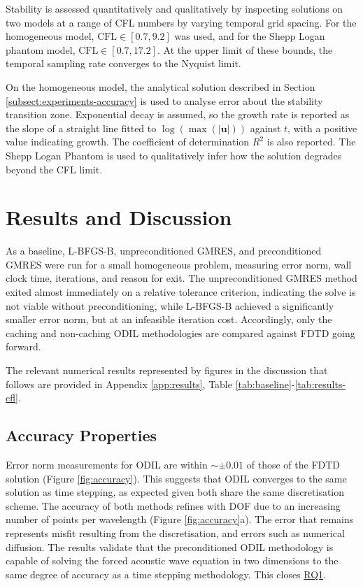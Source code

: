 \documentclass[final-report]{report-template}
\begin{document}
Stability is assessed quantitatively and qualitatively by inspecting solutions on two models at a range of CFL numbers by varying temporal grid spacing. For the homogeneous model, $\text{CFL} \in[0.7, 9.2]$ was used, and for the Shepp Logan phantom model, $\text{CFL}\in[0.7, 17.2]$. At the upper limit of these bounds, the temporal sampling rate converges to the Nyquist limit. 

On the homogeneous model, the analytical solution described in Section \ref{subsect:experiments-accuracy} is used to analyse error about the stability transition zone. Exponential decay is assumed, so the growth rate is reported as the slope of a straight line fitted to $\log\left(\max(|\mathbf{u}|)\right)$ against $t$, with a positive value indicating growth. The coefficient of determination $R^2$ is also reported. The Shepp Logan Phantom \cite{sheppFourierReconstructionHead1974} is used to qualitatively infer how the solution degrades beyond the CFL limit.  

\newpage
\section{Results and Discussion}
\label{sect:results}

As a baseline, L-BFGS-B, unpreconditioned GMRES, and preconditioned GMRES were run for a small homogeneous problem, measuring error norm, wall clock time, iterations, and reason for exit. The unpreconditioned GMRES method exited almost immediately on a relative tolerance  criterion, indicating the solve is not viable without preconditioning, while L-BFGS-B achieved a significantly smaller error norm, but at an infeasible iteration cost. Accordingly, only the caching and non-caching ODIL methodologies are compared against FDTD going forward.

The relevant numerical results represented by figures in the discussion that follows are provided in Appendix \ref{app:results}, Table \ref{tab:baseline}-\ref{tab:results-cfl}.

\subsection{Accuracy Properties}
\label{subsect:results_accuracy}

Error norm measurements for ODIL are within $\sim\pm 0.01$ of those of the FDTD solution (Figure \ref{fig:accuracy}). This suggests that ODIL converges to the same solution as time stepping, as expected given both share the same discretisation scheme. The accuracy of both methods refines with DOF due to an increasing number of points per wavelength (Figure \ref{fig:accuracy}a). The error that remains represents misfit resulting from the discretisation, and errors such as numerical diffusion. The results validate that the preconditioned ODIL methodology is capable of solving the forced acoustic wave equation in two dimensions to the same degree of accuracy as a time stepping methodology. This closes \hyperref[rq:1]{RQ1}.
\end{document}
